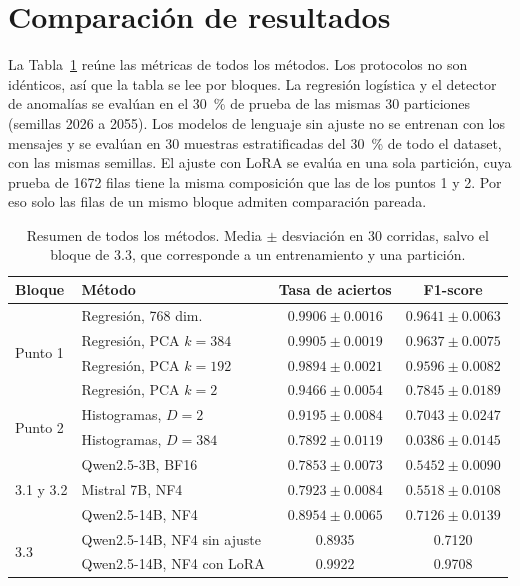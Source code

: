 \section{Comparación de resultados}
\label{sec:comparacion}

La Tabla~\ref{tab:comparacion} reúne las métricas de todos los métodos.
Los protocolos no son idénticos, así que la tabla se lee por bloques. La
regresión logística y el detector de anomalías se evalúan en el 30~\% de
prueba de las mismas 30 particiones (semillas 2026 a 2055). Los modelos de
lenguaje sin ajuste no se entrenan con los mensajes y se evalúan en 30
muestras estratificadas del 30~\% de todo el dataset, con las mismas
semillas. El ajuste con LoRA se evalúa en una sola partición, cuya prueba
de 1672 filas tiene la misma composición que las de los puntos 1 y 2. Por
eso solo las filas de un mismo bloque admiten comparación pareada.

\begin{table}[H]
    \centering
    \caption{Resumen de todos los métodos. Media $\pm$ desviación en 30
    corridas, salvo el bloque de 3.3, que corresponde a un entrenamiento y
    una partición.}
    \label{tab:comparacion}
    \small
    \begin{tabular}{llcc}
        \toprule
        Bloque & Método & Tasa de aciertos & F1-score \\
        \midrule
        \multirow{4}{*}{Punto 1}
            & Regresión, 768 dim. & $0.9906\pm0.0016$ & $0.9641\pm0.0063$ \\
            & Regresión, PCA $k=384$ & $0.9905\pm0.0019$ & $0.9637\pm0.0075$ \\
            & Regresión, PCA $k=192$ & $0.9894\pm0.0021$ & $0.9596\pm0.0082$ \\
            & Regresión, PCA $k=2$ & $0.9466\pm0.0054$ & $0.7845\pm0.0189$ \\
        \midrule
        \multirow{2}{*}{Punto 2}
            & Histogramas, $D=2$ & $0.9195\pm0.0084$ & $0.7043\pm0.0247$ \\
            & Histogramas, $D=384$ & $0.7892\pm0.0119$ & $0.0386\pm0.0145$ \\
        \midrule
        \multirow{3}{*}{3.1 y 3.2}
            & Qwen2.5-3B, BF16 & $0.7853\pm0.0073$ & $0.5452\pm0.0090$ \\
            & Mistral 7B, NF4 & $0.7923\pm0.0084$ & $0.5518\pm0.0108$ \\
            & Qwen2.5-14B, NF4 & $0.8954\pm0.0065$ & $0.7126\pm0.0139$ \\
        \midrule
        \multirow{2}{*}{3.3}
            & Qwen2.5-14B, NF4 sin ajuste & 0.8935 & 0.7120 \\
            & Qwen2.5-14B, NF4 con LoRA & 0.9922 & 0.9708 \\
        \bottomrule
    \end{tabular}
\end{table}

